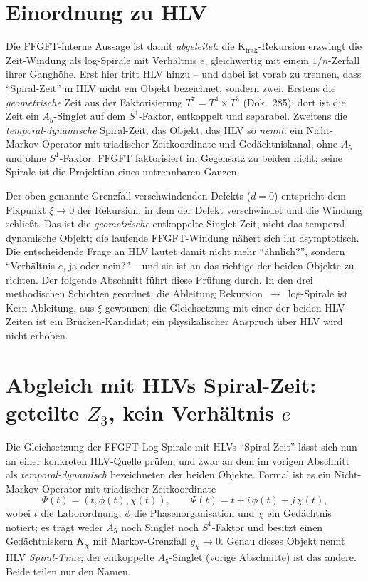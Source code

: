\section{Einordnung zu HLV}
Die FFGFT-interne Aussage ist damit \emph{abgeleitet}: die K$_{\text{frak}}$-Rekursion erzwingt die
Zeit-Windung als log-Spirale mit Verhältnis $e$, gleichwertig mit einem $1/n$-Zerfall ihrer
Ganghöhe. Erst hier tritt HLV hinzu -- und dabei ist vorab zu trennen, dass \enquote{Spiral-Zeit}
in HLV nicht ein Objekt bezeichnet, sondern zwei. Erstens die \emph{geometrische} Zeit aus der
Faktorisierung $T^7=T^4\times T^3$ (Dok.~285): dort ist die Zeit ein $A_5$-Singlet auf dem
$S^1$-Faktor, entkoppelt und separabel. Zweitens die \emph{temporal-dynamische} Spiral-Zeit, das
Objekt, das HLV so \emph{nennt}: ein Nicht-Markov-Operator mit triadischer Zeitkoordinate und
Gedächtniskanal, ohne $A_5$ und ohne $S^1$-Faktor. FFGFT faktorisiert im Gegensatz zu beiden nicht;
seine Spirale ist die Projektion eines untrennbaren Ganzen.

Der oben genannte Grenzfall verschwindenden Defekts ($d=0$)
entspricht dem Fixpunkt $\xi\to0$ der
Rekursion, in dem der Defekt verschwindet und die Windung schließt. Das ist die \emph{geometrische}
entkoppelte Singlet-Zeit, nicht das temporal-dynamische Objekt; die laufende FFGFT-Windung nähert
sich ihr asymptotisch. Die entscheidende Frage an HLV lautet damit nicht mehr \enquote{ähnlich?},
sondern \enquote{Verhältnis $e$, ja oder nein?} -- und sie ist an das richtige der beiden Objekte
zu richten. Der folgende Abschnitt führt diese Prüfung durch. In den drei methodischen Schichten
geordnet: die Ableitung Rekursion~$\to$~log-Spirale ist Kern-Ableitung, aus $\xi$ gewonnen; die
Gleichsetzung mit einer der beiden HLV-Zeiten ist ein Brücken-Kandidat; ein physikalischer Anspruch
über HLV wird nicht erhoben.

\section{Abgleich mit HLVs Spiral-Zeit: geteilte $Z_3$, kein Verhältnis $e$}
Die Gleichsetzung der FFGFT-Log-Spirale mit HLVs \enquote{Spiral-Zeit} lässt sich nun an einer
konkreten HLV-Quelle prüfen, und zwar an dem im vorigen Abschnitt als \emph{temporal-dynamisch}
bezeichneten der beiden Objekte. Formal ist es ein Nicht-Markov-Operator mit triadischer
Zeitkoordinate
\begin{equation}
  \Psi(t)=(t,\phi(t),\chi(t)),\qquad \Psi(t)=t+i\,\phi(t)+j\,\chi(t),
\end{equation}
wobei $t$ die Laborordnung, $\phi$ die Phasenorganisation und $\chi$ ein Gedächtnis notiert; es
trägt weder $A_5$ noch Singlet noch $S^1$-Faktor und besitzt einen Gedächtniskern $K_\chi$ mit
Markov-Grenzfall $g_\chi\to0$. Genau dieses Objekt nennt HLV \emph{Spiral-Time}; der entkoppelte
$A_5$-Singlet (vorige Abschnitte) ist das andere. Beide teilen nur den Namen.


